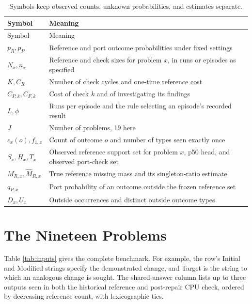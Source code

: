 \documentclass[10pt,letterpaper]{article}
\begin{document}
\begin{longtable}[]{@{}
  >{\raggedright\arraybackslash}p{}
  >{\raggedright\arraybackslash}p{}@{}}
\caption{Symbols keep observed counts, unknown probabilities, and estimates
separate.}\tabularnewline
\toprule\noalign{}
\begin{minipage}[b]{\linewidth}\raggedright
Symbol
\end{minipage} & \begin{minipage}[b]{\linewidth}\raggedright
Meaning
\end{minipage} \\
\midrule\noalign{}
\endfirsthead
\toprule\noalign{}
\begin{minipage}[b]{\linewidth}\raggedright
Symbol
\end{minipage} & \begin{minipage}[b]{\linewidth}\raggedright
Meaning
\end{minipage} \\
\midrule\noalign{}
\endhead
\bottomrule\noalign{}
\endlastfoot
\(p_R,p_P\) & Reference and port outcome probabilities under fixed settings \\
\(N_x,n_x\) & Reference and check sizes for problem \(x\), in runs or episodes as
specified \\
\(K,C_R\) & Number of check cycles and one-time reference cost \\
\(C_{P,k},C_{F,k}\) & Cost of check \(k\) and of investigating its findings \\
\(L,\phi\) & Runs per episode and the rule selecting an episode's recorded result \\
\(J\) & Number of problems, 19 here \\
\(c_x(o),f_{1,x}\) & Count of outcome \(o\) and number of types seen exactly once \\
\(S_x,H_x,T_x\) & Observed reference support set for problem \(x\), p50 head, and observed
port-check set \\
\(M_{R,x},\widehat M_{R,x}\) & True reference missing mass and its singleton-ratio
estimate \\
\(q_{P,x}\) & Port probability of an outcome outside the frozen reference set \\
\(D_x,U_x\) & Outside occurrences and distinct outside outcome types \\
\end{longtable}

\clearpage

\section{The Nineteen Problems}\label{app:inputs}

Table \ref{tab:inputs} gives the complete benchmark. For example, the row's Initial and
Modified strings specify the demonstrated change, and Target is the string to which an
analogous change is sought. The shared-answer column lists up to three outputs seen in
both the historical reference and post-repair CPU check, ordered by decreasing reference
count, with lexicographic ties.


\end{document}
